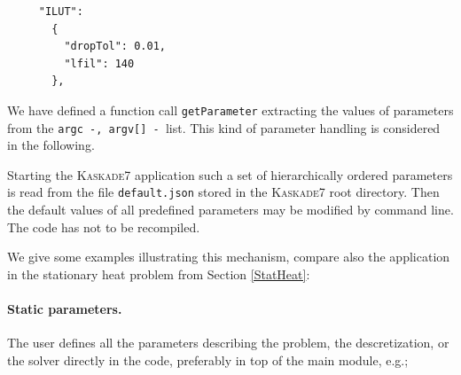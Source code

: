 \documentclass[11pt]{article}
\newcommand{\K}{\textsc{Kaskade7 }}
\begin{document}
\begin{scriptsize}
\begin{verbatim}
     "ILUT":
       {
         "dropTol": 0.01,
         "lfil": 140
       },
\end{verbatim}
\end{scriptsize}

\noindent We have
defined a function call {\tt getParameter} extracting the values of parameters from the
{\tt argc -, argv[] - }list. This kind of parameter handling is considered in
the following.

Starting the \K application such a set of hierarchically ordered parameters is read from
the file {\tt default.json} stored in the \K root directory. Then the default values of all predefined parameters
may be modified by command line. The code has not to be recompiled.

We give some examples  illustrating this mechanism, compare also the application in the stationary heat
problem from Section \ref{StatHeat}:

\paragraph {Static parameters.}
The user defines all the parameters describing the problem, the
descretization, or the solver directly in the code, preferably in top 
of the main module, e.g.;
\end{document}

